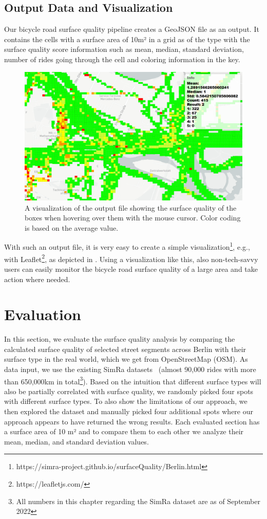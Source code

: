 \subsection{Output Data and Visualization}
\label{subsec:output_data_and_visualization}
Our bicycle road surface quality pipeline creates a GeoJSON file as an output.
It contains the cells with a surface area of 10m² in a grid as  of the  type  with the surface quality score information such as mean, median, standard deviation, number of rides going through the cell and coloring information in the  key.
 \begin{figure}
    \centering
    \includegraphics[width=0.7\columnwidth]{fig/visualization.png}
    \caption{%
A visualization of the output file showing the surface quality of the boxes when hovering over them with the mouse cursor. Color coding is based on the average value.}%
    \label{fig:visualization}
\end{figure}
With such an output file, it is very easy to create a simple visualization\footnote{https://simra-project.github.io/surfaceQuality/Berlin.html}, e.g., with Leaflet\footnote{https://leafletjs.com/}, as depicted in .
Using a visualization like this, also non-tech-savvy users can easily monitor the bicycle road surface quality of a large area and take action where needed.


\section{Evaluation}
\label{sec:evaluation_cyclequality}
In this section, we evaluate the surface quality analysis by comparing the calculated surface quality of selected street segments across Berlin with their surface type in the real world, which we get from OpenStreetMap (OSM).
As data input, we use the existing SimRa datasets~\cite{dataset_simra_set1,dataset_simra_set2,dataset_simra_set3} (almost 90,000 rides with more than 650,000km in total\footnote{All numbers in this chapter regarding the SimRa dataset are as of September 2022}).
Based on the intuition that different surface types will also be partially correlated with surface quality, we randomly picked four spots with different surface types.
To also show the limitations of our approach, we then explored the dataset and manually picked four additional spots where our approach appears to have returned the wrong results.
Each evaluated section has a surface area of 10 m² and to compare them to each other we analyze their mean, median, and standard deviation values.

